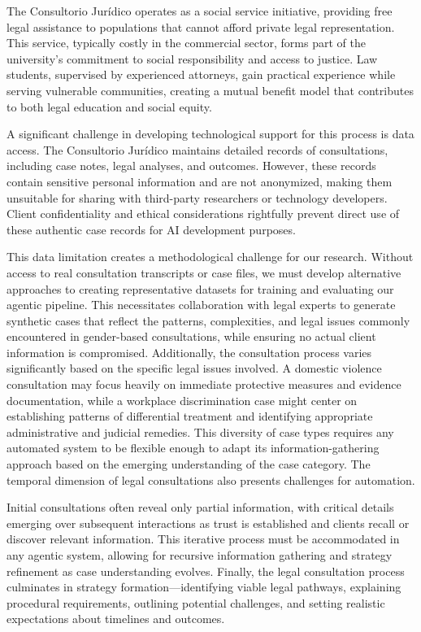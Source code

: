 The Consultorio Jurídico operates as a social service initiative, providing free legal assistance 
to populations that cannot afford private legal representation. This service, typically costly 
in the commercial sector, forms part of the university's commitment to social responsibility 
and access to justice. Law students, supervised by experienced attorneys, gain practical 
experience while serving vulnerable communities, creating a mutual benefit model that contributes 
to both legal education and social equity.

A significant challenge in developing technological support for this process is data access. 
The Consultorio Jurídico maintains detailed records of consultations, including case notes, 
legal analyses, and outcomes. However, these records contain sensitive personal information 
and are not anonymized, making them unsuitable for sharing with third-party researchers or 
technology developers. Client confidentiality and ethical considerations rightfully prevent 
direct use of these authentic case records for AI development purposes.

This data limitation creates a methodological challenge for our research. Without access to 
real consultation transcripts or case files, we must develop alternative approaches to creating 
representative datasets for training and evaluating our agentic pipeline. This necessitates 
collaboration with legal experts to generate synthetic cases that reflect the patterns, 
complexities, and legal issues commonly encountered in gender-based consultations, while ensuring 
no actual client information is compromised.
Additionally, the consultation process varies significantly based on the specific legal issues 
involved. A domestic violence consultation may focus heavily on immediate protective 
measures and evidence documentation, while a workplace discrimination case might center on 
establishing patterns of differential treatment and identifying appropriate administrative and 
judicial remedies. This diversity of case types requires any automated system to be flexible enough 
to adapt its information-gathering approach based on the emerging understanding of the case category.
The temporal dimension of legal consultations also presents challenges for automation. 

Initial consultations often reveal only partial information, with critical details emerging over 
subsequent interactions as trust is established and clients recall or discover relevant information. 
This iterative process must be accommodated in any agentic system, allowing for recursive 
information gathering and strategy refinement as case understanding evolves.
Finally, the legal consultation process culminates in strategy formation—identifying viable 
legal pathways, explaining procedural requirements, outlining potential challenges, and setting 
realistic expectations about timelines and outcomes. 

